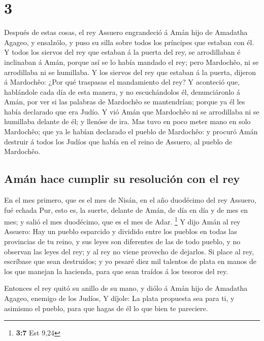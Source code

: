 \hypertarget{section-2}{%
\section{3}\label{section-2}}

 Después de estas cosas, el rey Assuero engrandeció á Amán
hijo de Amadatha Agageo, y ensalzólo, y puso su silla sobre todos los
príncipes que estaban con él.  Y todos los siervos del rey
que estaban á la puerta del rey, se arrodillaban é inclinaban á Amán,
porque así se lo había mandado el rey; pero Mardochêo, ni se arrodillaba
ni se humillaba.  Y los siervos del rey que estaban á la
puerta, dijeron á Mardochêo: ¿Por qué traspasas el mandamiento del rey?
 Y aconteció que, hablándole cada día de esta manera, y no
escuchándolos él, denunciáronlo á Amán, por ver si las palabras de
Mardochêo se mantendrían; porque ya él les había declarado que era
Judío.  Y vió Amán que Mardochêo ni se arrodillaba ni se
humillaba delante de él; y llenóse de ira.  Mas tuvo en poco
meter mano en solo Mardochêo; que ya le habían declarado el pueblo de
Mardochêo: y procuró Amán destruir á todos los Judíos que había en el
reino de Assuero, al pueblo de Mardochêo.

\hypertarget{amuxe1n-hace-cumplir-su-resoluciuxf3n-con-el-rey}{%
\subsection{Amán hace cumplir su resolución con el
rey}\label{amuxe1n-hace-cumplir-su-resoluciuxf3n-con-el-rey}}

 En el mes primero, que es el mes de Nisán, en el año
duodécimo del rey Assuero, fué echada Pur, esto es, la suerte, delante
de Amán, de día en día y de mes en mes; y salió el mes duodécimo, que es
el mes de Adar. \footnote{\textbf{3:7} Est 9,24}  Y dijo
Amán al rey Assuero: Hay un pueblo esparcido y dividido entre los
pueblos en todas las provincias de tu reino, y sus leyes son diferentes
de las de todo pueblo, y no observan las leyes del rey; y al rey no
viene provecho de dejarlos.  Si place al rey, escríbase que
sean destruídos; y yo pesaré diez mil talentos de plata en manos de los
que manejan la hacienda, para que sean traídos á los tesoros del rey.

 Entonces el rey quitó su anillo de su mano, y diólo á Amán
hijo de Amadatha Agageo, enemigo de los Judíos,  Y díjole:
La plata propuesta sea para ti, y asimismo el pueblo, para que hagas de
él lo que bien te pareciere.

